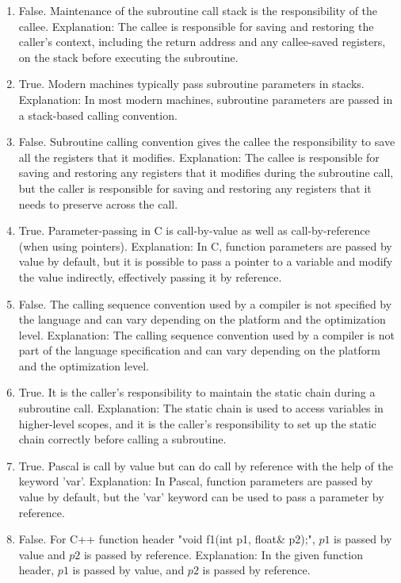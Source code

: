 \documentclass[letterpaper,11pt]{article}
\newcounter{problemid}
\def\newproblem{\clearpage\newpage{\bf Problem~\arabic{problemid}\stepcounter{problemid}}\hfill\par}
\begin{document}
\newproblem 
\begin{enumerate}

    \item False. Maintenance of the subroutine call stack is the responsibility of the callee.
    Explanation: The callee is responsible for saving and restoring the caller's context, including the return address and any callee-saved registers, on the stack before executing the subroutine.
    
    \item True. Modern machines typically pass subroutine parameters in stacks.
    Explanation: In most modern machines, subroutine parameters are passed in a stack-based calling convention.
    
    \item False. Subroutine calling convention gives the callee the responsibility to save all the registers that it modifies.
    Explanation: The callee is responsible for saving and restoring any registers that it modifies during the subroutine call, but the caller is responsible for saving and restoring any registers that it needs to preserve across the call.
    
    \item True. Parameter-passing in C is call-by-value as well as call-by-reference (when using pointers).
    Explanation: In C, function parameters are passed by value by default, but it is possible to pass a pointer to a variable and modify the value indirectly, effectively passing it by reference.
    
    \item False. The calling sequence convention used by a compiler is not specified by the language and can vary depending on the platform and the optimization level.
    Explanation: The calling sequence convention used by a compiler is not part of the language specification and can vary depending on the platform and the optimization level.
    
    \item True. It is the caller's responsibility to maintain the static chain during a subroutine call.
    Explanation: The static chain is used to access variables in higher-level scopes, and it is the caller's responsibility to set up the static chain correctly before calling a subroutine.
    
    \item True. Pascal is call by value but can do call by reference with the help of the keyword 'var'.
    Explanation: In Pascal, function parameters are passed by value by default, but the 'var' keyword can be used to pass a parameter by reference.
    
    \item False. For C++ function header "void f1(int p1, float\& p2);", $p1$ is passed by value and $p2$ is passed by reference.
    Explanation: In the given function header, $p1$ is passed by value, and $p2$ is passed by reference.   
    
\end{enumerate} 
\end{document}

